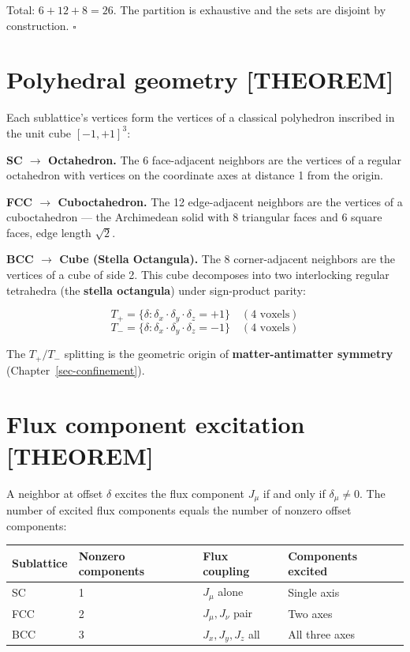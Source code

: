 \documentclass[
  11pt,
  letterpaper,
  twoside,
  openany]{book}
\makeatletter
\let\orig@section\section
\renewcommand{\section}{\needspace{8\baselineskip}\orig@section}
\makeatother
\begin{document}
Total: \(6 + 12 + 8 = 26\). The partition is exhaustive and the sets are
disjoint by construction. \(\square\)

\section{Polyhedral geometry
{[}THEOREM{]}}\label{polyhedral-geometry-theorem}

Each sublattice's vertices form the vertices of a classical polyhedron
inscribed in the unit cube \([-1, +1]^3\):

\textbf{SC \(\to\) Octahedron.} The 6 face-adjacent neighbors are the
vertices of a regular octahedron with vertices on the coordinate axes at
distance 1 from the origin.

\textbf{FCC \(\to\) Cuboctahedron.} The 12 edge-adjacent neighbors are
the vertices of a cuboctahedron --- the Archimedean solid with 8
triangular faces and 6 square faces, edge length \(\sqrt{2}\).

\textbf{BCC \(\to\) Cube (Stella Octangula).} The 8 corner-adjacent
neighbors are the vertices of a cube of side 2. This cube decomposes
into two interlocking regular tetrahedra (the \textbf{stella octangula})
under sign-product parity:

\[
T_+ = \{ \delta : \delta_x \cdot \delta_y \cdot \delta_z = +1 \} \quad (4 \text{ voxels})
\] \[
T_- = \{ \delta : \delta_x \cdot \delta_y \cdot \delta_z = -1 \} \quad (4 \text{ voxels})
\]

The \(T_+/T_-\) splitting is the geometric origin of
\textbf{matter-antimatter symmetry} (Chapter~\ref{sec-confinement}).

\section{Flux component excitation
{[}THEOREM{]}}\label{flux-component-excitation-theorem}

A neighbor at offset \(\delta\) excites the flux component \(J_\mu\) if
and only if \(\delta_\mu \neq 0\). The number of excited flux components
equals the number of nonzero offset components:

\begin{longtable}[]{@{}llll@{}}
\toprule\noalign{}
Sublattice & Nonzero components & Flux coupling & Components excited \\
\midrule\noalign{}
\endhead
\bottomrule\noalign{}
\endlastfoot
SC & 1 & \(J_\mu\) alone & Single axis \\
FCC & 2 & \(J_\mu, J_\nu\) pair & Two axes \\
BCC & 3 & \(J_x, J_y, J_z\) all & All three axes \\
\end{longtable}
\end{document}
